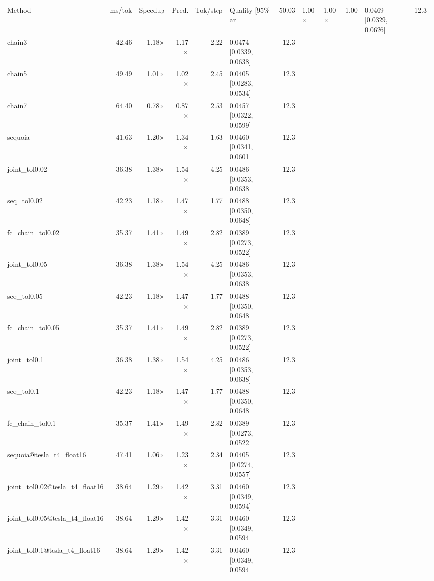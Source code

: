 \begin{tabular}{lrrrrlr}
\toprule
Method & ms/tok & Speedup & Pred. & Tok/step & Quality [95\%%
\midrule
ar & 50.03 & 1.00$\times$ & 1.00$\times$ & 1.00 & 0.0469 [0.0329, 0.0626] & 12.3 \\
chain3 & 42.46 & 1.18$\times$ & 1.17$\times$ & 2.22 & 0.0474 [0.0339, 0.0638] & 12.3 \\
chain5 & 49.49 & 1.01$\times$ & 1.02$\times$ & 2.45 & 0.0405 [0.0283, 0.0534] & 12.3 \\
chain7 & 64.40 & 0.78$\times$ & 0.87$\times$ & 2.53 & 0.0457 [0.0322, 0.0599] & 12.3 \\
sequoia & 41.63 & 1.20$\times$ & 1.34$\times$ & 1.63 & 0.0460 [0.0341, 0.0601] & 12.3 \\
joint\_tol0.02 & 36.38 & 1.38$\times$ & 1.54$\times$ & 4.25 & 0.0486 [0.0353, 0.0638] & 12.3 \\
seq\_tol0.02 & 42.23 & 1.18$\times$ & 1.47$\times$ & 1.77 & 0.0488 [0.0350, 0.0648] & 12.3 \\
fc\_chain\_tol0.02 & 35.37 & 1.41$\times$ & 1.49$\times$ & 2.82 & 0.0389 [0.0273, 0.0522] & 12.3 \\
joint\_tol0.05 & 36.38 & 1.38$\times$ & 1.54$\times$ & 4.25 & 0.0486 [0.0353, 0.0638] & 12.3 \\
seq\_tol0.05 & 42.23 & 1.18$\times$ & 1.47$\times$ & 1.77 & 0.0488 [0.0350, 0.0648] & 12.3 \\
fc\_chain\_tol0.05 & 35.37 & 1.41$\times$ & 1.49$\times$ & 2.82 & 0.0389 [0.0273, 0.0522] & 12.3 \\
joint\_tol0.1 & 36.38 & 1.38$\times$ & 1.54$\times$ & 4.25 & 0.0486 [0.0353, 0.0638] & 12.3 \\
seq\_tol0.1 & 42.23 & 1.18$\times$ & 1.47$\times$ & 1.77 & 0.0488 [0.0350, 0.0648] & 12.3 \\
fc\_chain\_tol0.1 & 35.37 & 1.41$\times$ & 1.49$\times$ & 2.82 & 0.0389 [0.0273, 0.0522] & 12.3 \\
sequoia@tesla\_t4\_float16 & 47.41 & 1.06$\times$ & 1.23$\times$ & 2.34 & 0.0405 [0.0274, 0.0557] & 12.3 \\
joint\_tol0.02@tesla\_t4\_float16 & 38.64 & 1.29$\times$ & 1.42$\times$ & 3.31 & 0.0460 [0.0349, 0.0594] & 12.3 \\
joint\_tol0.05@tesla\_t4\_float16 & 38.64 & 1.29$\times$ & 1.42$\times$ & 3.31 & 0.0460 [0.0349, 0.0594] & 12.3 \\
joint\_tol0.1@tesla\_t4\_float16 & 38.64 & 1.29$\times$ & 1.42$\times$ & 3.31 & 0.0460 [0.0349, 0.0594] & 12.3 \\
\bottomrule
\end{tabular}
